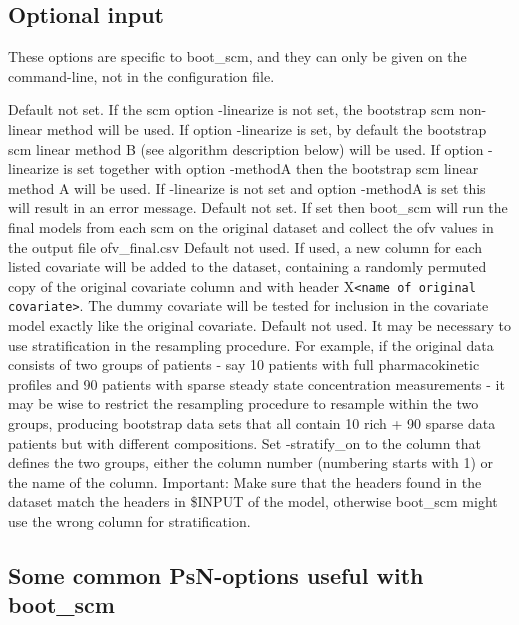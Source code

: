 \subsection{Optional input}
These options are specific to boot\_scm, and they can only be given on the command-line, not in the configuration file.
\begin{optionlist}
Default not set. If the scm option -linearize is not set, the bootstrap scm non-linear method will be used. If option -linearize is set, by default the bootstrap scm linear method B (see algorithm description below) will be used. If option -linearize is set  together with option -methodA then the bootstrap scm linear method A will be used. If -linearize is not set and option -methodA is set this will result in an error message.  
\nextopt
{}
Default not set. If set then boot\_scm will run the final models from each scm on the original dataset and collect the ofv values in the output file ofv\_final.csv   
\nextopt
{}
Default not used. If used, a new column for each listed covariate will be added to the dataset, containing a randomly permuted copy of the original covariate column and with header X\verb|<name of original covariate>|. The dummy covariate will be tested for inclusion in the covariate model exactly like the original covariate. 
\nextopt
{}
Default not used. It may be necessary to use stratification in the resampling procedure. For example, if the original data consists of two groups of patients - say 10 patients with full pharmacokinetic profiles and 90 patients with sparse steady state concentration measurements - it may be wise to restrict the resampling procedure to resample within the two groups, producing bootstrap data sets that all contain 10 rich + 90 sparse data patients but with different compositions. 
Set -stratify\_on to the column that defines the two groups, either the column number (numbering starts with 1) or the name of the column. Important: Make sure that the headers found in the dataset match the headers
in \$INPUT of the model, otherwise boot\_scm might use the wrong column for stratification.
\nextopt
\end{optionlist}


\subsection{Some common PsN-options useful with boot\_scm}

